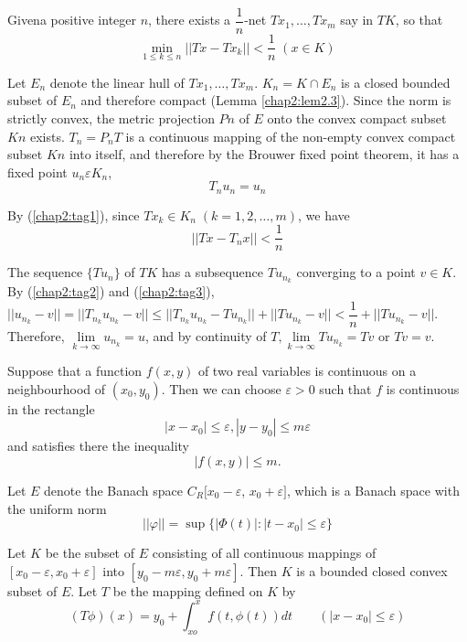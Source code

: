  Given\pageoriginale a positive integer $n$, there exists a $\dfrac{1}{n}$-net
 $Tx_1, \ldots, Tx_m$ say in $T K $, so that 
\begin{equation}
  \min\limits_{1 \le k \le n} || Tx - Tx_k || < \frac{1}{n} \; (x \in K)
  \label{chap2:tag1} 
\end{equation} 
 
Let $E_n$ denote the linear hull of $Tx_1,\ldots, Tx_m$. $K_n = K \cap
E_n$ is a closed bounded subset of $E_n$ and therefore compact (Lemma
\ref{chap2:lem2.3}). Since the norm is strictly convex, the metric
projection $Pn$ of 
$E$ onto the convex compact subset $Kn$ exists. $T_n = P_n T$ is a
continuous mapping of the non-empty convex compact subset $Kn$ into
itself, and therefore by the Brouwer fixed point theorem, it has a
fixed point $u_n \varepsilon  K_n$, 
\begin{equation}
  T_n u_n = u_n \label{chap2:tag2}
\end{equation}
 
By (\ref{chap2:tag1}), since $Tx _k \in K_n \; (k = 1, 2, \ldots, m)$, we have
\begin{equation*}
  || Tx - T_n x || < \frac{1}{n} \tag{3}\label{chap2:tag3}
\end{equation*} 
 
The sequence $\{Tu_n\}$ of $T K $ has a subsequence $Tu_{n_k}$
converging to a point $v \in K$. By (\ref{chap2:tag2}) and
(\ref{chap2:tag3}), $|| u_{n_k} - v || 
= || T_{n_k} u_{n_k} - v|| \le || T_{n_k} u_{n_k} - Tu_{n_k} || + ||
Tu _{n_k} - v || < \dfrac{1}{n} + || Tu_{n_k} - v|| $. Therefore,
$\lim\limits_{k \to \infty} u_{n_k} = u$, and by continuity of $T,
\lim\limits_{k \to \infty} Tu_{n_k} = Tv$ or $Tv = v$. 

\begin{example*}%
  Suppose that a function $f(x, y)$ of two real variables is
  continuous on a neighbourhood of $(x_0, y_0)$. Then we can choose
  $\varepsilon > 0$ such that $f$ is continuous in the rectangle 
 $$
 |x -x_0| \le \varepsilon, |y - y_0| \le m \varepsilon
 $$\pageoriginale
 and satisfies there the inequality 
 $$
 |f (x, y)| \le m.
 $$
\end{example*}

 Let $E$ denote the Banach space $C_R [x_0 - \varepsilon$, $x_0 +
   \varepsilon]$, which is a Banach space with the 
 uniform norm 
 $$
 || \varphi || = \sup \bigg\{ | \Phi (t) | : |t - x_0| \le \varepsilon
 \bigg\} 
 $$ 
 
 Let $K$ be the subset of $E$ consisting of all continuous mappings of
 $[x_0 - \varepsilon, x_0 + \varepsilon]$ into $[y_0- m \varepsilon,
   y_0 + m \varepsilon]$. Then $K$ is a bounded closed convex subset
 of $E$. Let $T$ be the mapping defined on $K$ by 
 $$
 (T \phi) (x) = y_0  + \int^x_{xo} f (t, \phi (t)) dt \qquad (|x -x_0|
 \le \varepsilon) 
 $$
 
